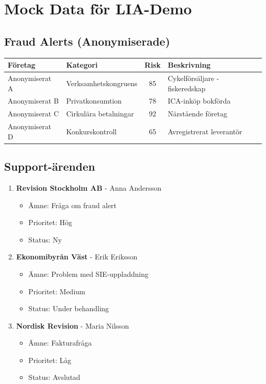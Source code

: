 \documentclass[12pt,a4paper]{article}
\begin{document}
\section{Mock Data för LIA-Demo}

\subsection{Fraud Alerts (Anonymiserade)}
\begin{table}[h]
\centering
\small
\begin{tabular}{|l|l|c|l|}
\hline
\textbf{Företag} & \textbf{Kategori} & \textbf{Risk} & \textbf{Beskrivning} \\
\hline
Anonymiserat A & Verksamhetskongruens & 85 & Cykelförsäljare - fiskeredskap \\
Anonymiserat B & Privatkonsumtion & 78 & ICA-inköp bokförda \\
Anonymiserat C & Cirkulära betalningar & 92 & Närstående företag \\
Anonymiserat D & Konkurskontroll & 65 & Avregistrerat leverantör \\
\hline
\end{tabular}
\end{table}

\subsection{Support-ärenden}
\begin{enumerate}
  \item \textbf{Revision Stockholm AB} - Anna Andersson
  \begin{itemize}
    \item Ämne: Fråga om fraud alert
    \item Prioritet: Hög
    \item Status: Ny
  \end{itemize}
  
  \item \textbf{Ekonomibyrån Väst} - Erik Eriksson
  \begin{itemize}
    \item Ämne: Problem med SIE-uppladdning
    \item Prioritet: Medium
    \item Status: Under behandling
  \end{itemize}
  
  \item \textbf{Nordisk Revision} - Maria Nilsson
  \begin{itemize}
    \item Ämne: Fakturafråga
    \item Prioritet: Låg
    \item Status: Avslutad
  \end{itemize}
\end{enumerate}
\end{document}

